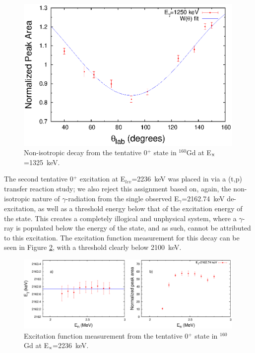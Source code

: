 \begin{center}
\begin{figure}[h!]
\includegraphics[width=0.99\textwidth]{1250_Gd.eps}
\caption{Non-isotropic decay from the tentative 0$^+$ state in $^{160}$Gd at E$_{\rm x}$=1325~keV. \label{fig:160Gd_1250_noniso}}
\end{figure}
\end{center}

The second tentative 0$^+$ excitation at E$_{lev}$=2236~keV was placed in \cite{Lovhoiden_160pt} via a (t,p) transfer reaction study; we also reject this assignment based on, again, the non-isotropic nature of $\gamma$-radiation from the single observed E$_\gamma$=2162.74~keV de-excitation, as well as a threshold energy below that of the excitation energy of the state. This creates a completely illogical and unphysical system, where a $\gamma$-ray is populated below the energy of the state, and as such, cannot be attributed to this excitation. The excitation function measurement for this decay can be seen in Figure \ref{fig:160Gd_2163_exfGd}, with a threshold clearly below 2100~keV.

\begin{center}
\begin{figure}[h!]
\includegraphics[width=0.99\textwidth]{2163_exfGd.eps}
\caption{Excitation function measurement from the tentative 0$^+$ state in $^{160}$Gd at E$_{\rm x}$=2236~keV. \label{fig:160Gd_2163_exfGd}}
\end{figure}
\end{center}

